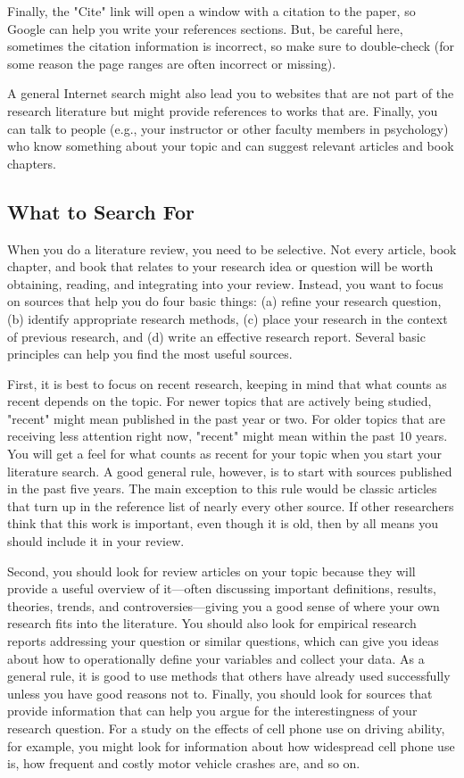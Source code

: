 Finally, the "Cite" link will open a window with a citation to the paper, so Google can help you write your references sections. But, be careful here, sometimes the citation information is incorrect, so make sure to double-check (for some reason the page ranges are often incorrect or missing).

 A general Internet search might also lead you to websites that are not part of the research literature but might provide references to works that are. Finally, you can talk to people (e.g., your instructor or other faculty members in psychology) who know something about your topic and can suggest relevant articles and book chapters.

\subsection{What to Search For}
When you do a literature review, you need to be selective. Not every article, book chapter, and book that relates to your research idea or question will be worth obtaining, reading, and integrating into your review. Instead, you want to focus on sources that help you do four basic things: (a) refine your research question, (b) identify appropriate research methods, (c) place your research in the context of previous research, and (d) write an effective research report. Several basic principles can help you find the most useful sources.

First, it is best to focus on recent research, keeping in mind that what counts as recent depends on the topic. For newer topics that are actively being studied, "recent" might mean published in the past year or two. For older topics that are receiving less attention right now, "recent" might mean within the past 10 years. You will get a feel for what counts as recent for your topic when you start your literature search. A good general rule, however, is to start with sources published in the past five years. The main exception to this rule would be classic articles that turn up in the reference list of nearly every other source. If other researchers think that this work is important, even though it is old, then by all means you should include it in your review.

Second, you should look for review articles on your topic because they will provide a useful overview of it---often discussing important definitions, results, theories, trends, and controversies---giving you a good sense of where your own research fits into the literature. You should also look for empirical research reports addressing your question or similar questions, which can give you ideas about how to operationally define your variables and collect your data. As a general rule, it is good to use methods that others have already used successfully unless you have good reasons not to. Finally, you should look for sources that provide information that can help you argue for the interestingness of your research question. For a study on the effects of cell phone use on driving ability, for example, you might look for information about how widespread cell phone use is, how frequent and costly motor vehicle crashes are, and so on.

